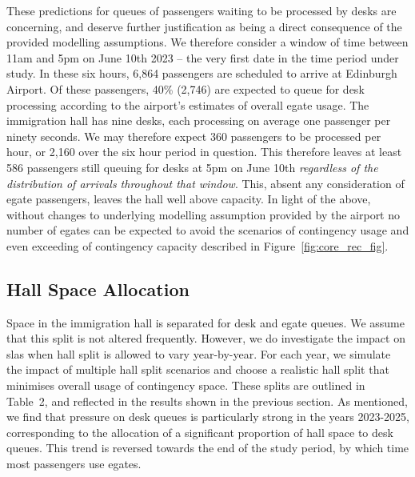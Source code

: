 \documentclass[10pt]{article}
\begin{document}
These predictions for queues of passengers waiting to be processed by desks are concerning, and deserve further justification as being a direct consequence of the provided modelling assumptions. We therefore consider a window of time between 11am and 5pm on June 10th 2023 -- the very first date in the time period under study. In these six hours, 6,864 passengers are scheduled to arrive at Edinburgh Airport. Of these passengers, 40\% (2,746) are expected to queue for desk processing according to the airport's estimates of overall \gls{egate} usage. The immigration hall has nine desks, each processing on average one passenger per ninety seconds. We may therefore expect 360 passengers to be processed per hour, or 2,160 over the six hour period in question. This therefore leaves at least 586 passengers still queuing for desks at 5pm on June 10th \emph{regardless of the distribution of arrivals throughout that window}. This, absent any consideration of \gls{egate} passengers, leaves the hall well above capacity. In light of the above, without changes to underlying modelling assumption provided by the airport no number of \glspl{egate} can be expected to avoid the scenarios of contingency usage and even exceeding of contingency capacity described in Figure~\ref{fig:core_rec_fig}.



\subsection{Hall Space Allocation}

Space in the immigration hall is separated for desk and \gls{egate} queues. We assume that this split is not altered frequently. However, we do investigate the impact on \glspl{sla} when hall split is allowed to vary year-by-year. For each year, we simulate the impact of multiple hall split scenarios and choose a realistic hall split that minimises overall usage of contingency space. These splits are outlined in Table~2, and reflected in the results shown in the previous section. As mentioned, we find that pressure on desk queues is particularly strong in the years 2023-2025, corresponding to the allocation of a significant proportion of hall space to desk queues. This trend is reversed towards the end of the study period, by which time most passengers use \glspl{egate}.
\end{document}
